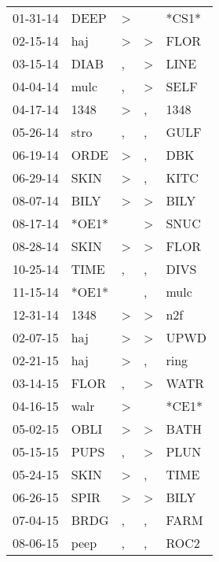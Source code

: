 \begin{supertabular}{lllll}
 01-31-14 &   DEEP &     \textgreater &                  &  *CS1* \\
 02-15-14 &    haj &     \textgreater &     \textgreater &   FLOR \\
 03-15-14 &   DIAB &                , &     \textgreater &   LINE \\
 04-04-14 &   mulc &                , &     \textgreater &   SELF \\
 04-17-14 &   1348 &     \textgreater &                , &   1348 \\
 05-26-14 &   stro &                , &                , &   GULF \\
 06-19-14 &   ORDE &     \textgreater &                , &    DBK \\
 06-29-14 &   SKIN &     \textgreater &                , &   KITC \\
 08-07-14 &   BILY &     \textgreater &     \textgreater &   BILY \\
 08-17-14 &  *OE1* &                  &     \textgreater &   SNUC \\
 08-28-14 &   SKIN &     \textgreater &     \textgreater &   FLOR \\
 10-25-14 &   TIME &                , &                , &   DIVS \\
 11-15-14 &  *OE1* &                  &                , &   mulc \\
 12-31-14 &   1348 &     \textgreater &     \textgreater &    n2f \\
 02-07-15 &    haj &     \textgreater &     \textgreater &   UPWD \\
 02-21-15 &    haj &     \textgreater &                , &   ring \\
 03-14-15 &   FLOR &                , &     \textgreater &   WATR \\
 04-16-15 &   walr &     \textgreater &                  &  *CE1* \\
 05-02-15 &   OBLI &     \textgreater &     \textgreater &   BATH \\
 05-15-15 &   PUPS &                , &     \textgreater &   PLUN \\
 05-24-15 &   SKIN &     \textgreater &                , &   TIME \\
 06-26-15 &   SPIR &     \textgreater &     \textgreater &   BILY \\
 07-04-15 &   BRDG &                , &                , &   FARM \\
 08-06-15 &   peep &                , &                , &   ROC2 \\

\end{supertabular}
